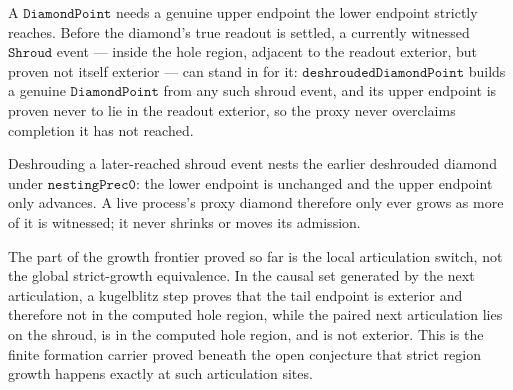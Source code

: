 \begin{theorem}\label{thm:deshrouded-diamond-point}\leanok{}
A $\texttt{DiamondPoint}$ needs a genuine upper endpoint the lower endpoint strictly reaches.
Before the diamond's true readout is settled, a currently witnessed $\texttt{Shroud}$ event ---
inside the hole region, adjacent to the readout exterior, but proven not itself exterior --- can
stand in for it: $\texttt{deshroudedDiamondPoint}$ builds a genuine $\texttt{DiamondPoint}$ from
any such shroud event, and its upper endpoint is proven never to lie in the readout exterior, so
the proxy never overclaims completion it has not reached.
\end{theorem}

\begin{theorem}\label{thm:deshrouded-diamond-point-nested}\leanok{}
Deshrouding a later-reached shroud event nests the earlier deshrouded diamond under
$\texttt{nestingPrec0}$: the lower endpoint is unchanged and the upper endpoint only advances.
A live process's proxy diamond therefore only ever grows as more of it is witnessed; it never
shrinks or moves its admission.
\end{theorem}

\begin{theorem}\label{thm:kugelblitz-local-hole-entry}\leanok{}
The part of the growth frontier proved so far is the local articulation switch,
not the global strict-growth equivalence.  In the causal set generated by the
next articulation, a kugelblitz step proves that the tail endpoint is exterior
and therefore not in the computed hole region, while the paired next
articulation lies on the shroud, is in the computed hole region, and is not
exterior.  This is the finite formation carrier proved beneath the open
conjecture that strict region growth happens exactly at such articulation
sites.
\end{theorem}


